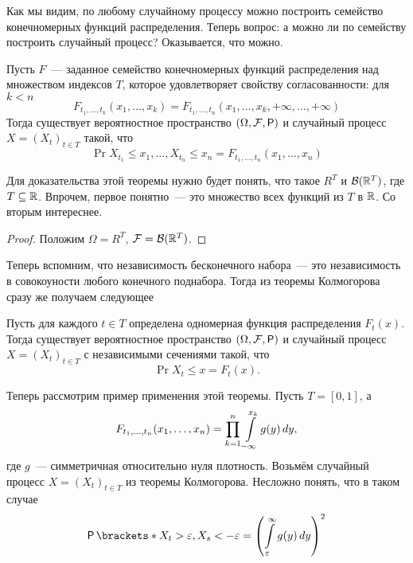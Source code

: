 Как мы видим, по любому случайному процессу можно построить семейство 
конечномерных функций распределения. Теперь вопрос: а можно ли по семейству 
построить случайный процесс? Оказывается, что можно.
\begin{theorem}
	Пусть \(F\)~--- заданное семейство конечномерных функций распределения над 
	множеством индексов \(T\), которое удовлетворяет свойству согласованности: 
	для \(k < n\)
	\[
		F_{t_{1}, \dots, t_{k}}(x_{1}, \dots, x_{k}) = F_{t_{1}, \dots, 
		t_{n}}(x_{1}, \dots, x_{k}, +\infty, \dots, +\infty)
	\]
	Тогда существует вероятностное пространство \((\Omega, \F, \Pr)\) и 
	случайный процесс \(X = (X_{t})_{t \in T}\) такой, что
	\[
		\Pr{X_{t_{1}} \leq x_{1}, \ldots, X_{t_{n}} \leq x_{n}} = F_{t_{1}, 
		\dots, t_{n}}(x_{1}, \dots, x_{n})
	\]
\end{theorem}
\begin{leftbar}
\begin{small}\noindent
	Для доказательства этой теоремы нужно будет понять, что такое \(R^{T}\) и 
	\(\mathcal{B}(\mathbb{R}^{T})\), где \(T \subseteq \mathbb{R}\). Впрочем, первое понятно~--- это 
	множество всех функций из \(T\) в \(\mathbb{R}\). Со вторым интереснее. 
	\begin{proof}
		Положим \(\Omega = R^{T}\), \(\mathcal{F} = \mathcal{B}(\mathbb{R}^{T})\). 
	\end{proof}
\end{small}
\end{leftbar}

Теперь вспомним, что независимость бесконечного набора~--- это независимость в 
совокоуности любого конечного поднабора. Тогда из теоремы Колмогорова сразу же 
получаем следующее
\begin{consequence}
	Пусть для каждого \(t \in T\) определена одномерная функция распределения 
	\(F_{t}(x)\). Тогда существует вероятностное пространство \((\Omega, \F, 
	\Pr)\) и случайный процесс \(X = (X_{t})_{t \in T}\) с независимыми 
	сечениями такой, что
	\[
		\Pr{X_{t} \leq x} = F_{t}(x).
	\]
\end{consequence}

Теперь рассмотрим пример применения этой теоремы. Пусть \(T = [0, 1]\), а 
\[
	F_{t_{1}, \ldots, t_{n}}(x_{1}, \ldots, x_{n}) = \prod_{k = 1}^{n} 
	\int\limits_{-\infty}^{x_{k}} g(y)\mathop{}\!d y,
\]
где \(g\)~--- симметричная относительно нуля плотность. Возьмём случайный 
процесс \(X = (X_{t})_{t \in T}\) из теоремы Колмогорова. Несложно понять, что 
в таком случае
\[
	\Pr{X_{t} > \epsilon, X_{s} < - \epsilon} = 
	\left(\int\limits_{\epsilon}^{\infty}g(y)\diff y\right)^{2}
\]

